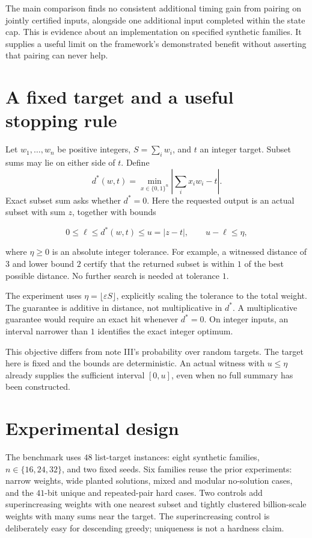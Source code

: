 \documentclass[10pt,english]{article}
\begin{document}
The main comparison finds no consistent additional timing gain from pairing on jointly certified inputs, alongside one additional input completed within the state cap. This is evidence about an implementation on specified synthetic families. It supplies a useful limit on the framework's demonstrated benefit without asserting that pairing can never help.

\section{A fixed target and a useful stopping rule}
Let \(w_1,\ldots,w_n\) be positive integers, \(S=\sum_iw_i\), and \(t\) an integer target. Subset sums may lie on either side of \(t\). Define
\[
d^*(w,t)=\min_{x\in\{0,1\}^n}\left|\sum_i x_iw_i-t\right|.
\]
Exact subset sum asks whether \(d^*=0\). Here the requested output is an actual subset with sum \(z\), together with bounds
\begin{tcolorbox}[accentbox]
\[
0\le\ell\le d^*(w,t)\le u=|z-t|,
\qquad u-\ell\le\eta,
\]
\end{tcolorbox}
where \(\eta\ge0\) is an absolute integer tolerance. For example, a witnessed distance of \(3\) and lower bound \(2\) certify that the returned subset is within \(1\) of the best possible distance. No further search is needed at tolerance \(1\).

The experiment uses \(\eta=\lfloor\varepsilon S\rfloor\), explicitly scaling the tolerance to the total weight. The guarantee is additive in distance, not multiplicative in \(d^*\). A multiplicative guarantee would require an exact hit whenever \(d^*=0\). On integer inputs, an interval narrower than \(1\) identifies the exact integer optimum.

This objective differs from note III's probability over random targets. The target here is fixed and the bounds are deterministic. An actual witness with \(u\le\eta\) already supplies the sufficient interval \([0,u]\), even when no full summary has been constructed.

\section{Experimental design}
The benchmark uses \(48\) list-target instances: eight synthetic families, \(n\in\{16,24,32\}\), and two fixed seeds. Six families reuse the prior experiments: narrow weights, wide planted solutions, mixed and modular no-solution cases, and the \(41\)-bit unique and repeated-pair hard cases. Two controls add superincreasing weights with one nearest subset and tightly clustered billion-scale weights with many sums near the target. The superincreasing control is deliberately easy for descending greedy; uniqueness is not a hardness claim.
\end{document}
